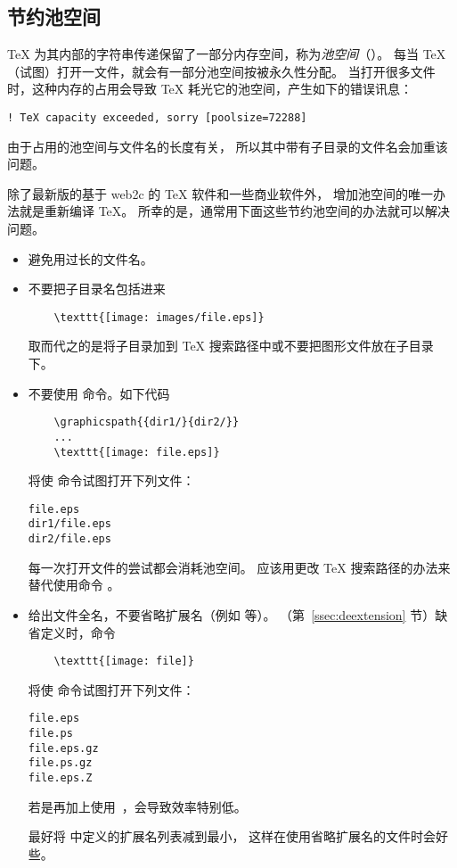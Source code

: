 \subsection{节约池空间}\label{ssec:poolspace}

\TeX{} 为其内部的字符串传递保留了一部分内存空间，称为\emph{池空间}（）。
每当 \TeX{} （试图）打开一文件，就会有一部分池空间按被永久性分配。
当打开很多文件时，这种内存的占用会导致 \TeX{} 耗光它的池空间，产生如下的错误讯息：
\begin{Verbatim}[xleftmargin=1cm]
! TeX capacity exceeded, sorry [poolsize=72288]
\end{Verbatim}

由于占用的池空间与文件名的长度有关，
所以其中带有子目录的文件名会加重该问题。

除了最新版的基于 web2c 的 \TeX{} 软件和一些商业软件外，
增加池空间的唯一办法就是重新编译 \TeX{}。
所幸的是，通常用下面这些节约池空间的办法就可以解决问题。

\begin{itemize}
\item 避免用过长的文件名。

\item 不要把子目录名包括进来
	\begin{lstlisting}
	\texttt{[image: images/file.eps]}
	\end{lstlisting}
	取而代之的是将子目录加到 \TeX{} 搜索路径中或不要把图形文件放在子目录下。
	
\item 不要使用  命令。如下代码
	\begin{lstlisting}
	\graphicspath{{dir1/}{dir2/}}
	...
	\texttt{[image: file.eps]}
	\end{lstlisting}
	将使  命令试图打开下列文件：
\begin{Verbatim}[xleftmargin=1.5cm]
file.eps
dir1/file.eps
dir2/file.eps
\end{Verbatim}
	每一次打开文件的尝试都会消耗池空间。
	应该用更改 \TeX{} 搜索路径的办法来替代使用命令 。
	
\item 给出文件全名，不要省略扩展名（例如  等）。
	 （第~\ref{ssec:deextension} 节）缺省定义时，命令
	\begin{lstlisting}
	\texttt{[image: file]}
	\end{lstlisting}
	将使  命令试图打开下列文件：
\begin{Verbatim}[xleftmargin=1.5cm]
file.eps
file.ps
file.eps.gz
file.ps.gz
file.eps.Z
\end{Verbatim}
	若是再加上使用~，会导致效率特别低。
	
	最好将  中定义的扩展名列表减到最小，
	这样在使用省略扩展名的文件时会好些。
\end{itemize}

